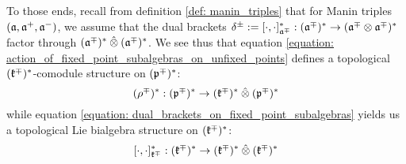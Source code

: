         To those ends, recall from definition \ref{def: manin_triples} that for Manin triples $(\mathfrak{a}, \mathfrak{a}^+, \mathfrak{a}^-)$, we assume that the dual brackets $\delta^{\pm} := [\cdot, \cdot]_{\a^{\mp}}^*: (\a^{\mp})^* \to (\a^{\mp} \tensor \a^{\mp})^*$ factor through $(\a^{\mp})^* \hattensor (\a^{\mp})^*$. We see thus that equation \eqref{equation: action_of_fixed_point_subalgebras_on_unfixed_points} defines a topological $(\mathfrak{k}^{\mp})^*$-comodule structure on $(\mathfrak{p}^{\mp})^*$:
            \begin{equation} \label{equation: coactions_on_unfixed_points}
                (\rho^{\mp})^*: (\p^{\mp})^* \to (\k^{\mp})^* \hattensor (\p^{\mp})^*
            \end{equation}
        while equation \eqref{equation: dual_brackets_on_fixed_point_subalgebras} yields us a topological Lie bialgebra structure on $(\mathfrak{k}^{\mp})^*$:
            \begin{equation} \label{equation: cobrackets_on_fixed_points}
                [\cdot, \cdot]_{\k^{\mp}}^*: (\k^{\mp})^* \to (\k^{\mp})^* \hattensor (\k^{\mp})^*
            \end{equation}
        \begin{remark}
        \end{remark}
        
